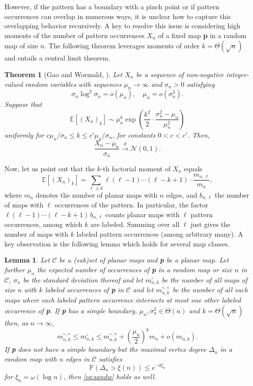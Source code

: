 \documentclass[reqno, 11pt]{amsart}
\newtheorem{theorem}{Theorem}
\newtheorem{lemma}{Lemma}
\theoremstyle{definition}
\theoremstyle{remark}
\newcommand{\PP}{\mathbb{P}}
\newcommand{\map}[1]{\textbf{#1}}
\numberwithin{equation}{section}
\begin{document}
However, if the pattern has a boundary with a pinch point or if pattern occurrences can overlap in numerous ways, it is unclear how to capture this overlapping behavior recursively. A key to resolve this issue is considering high moments of the number of pattern occurrences $X_n$ of a fixed map \map{p} in a random map of size $n$. The following theorem leverages moments of order $k = \Theta(\sqrt{n})$ and entails a central limit theorem.

\begin{theorem}[Gao and Wormald, \cite{GaoWormald}]\label{thm:gao}
    Let $X_n$ be a sequence of non-negative integer-valued random variables with sequences $\mu_n \to \infty$ and $\sigma_n > 0$ satisfying
    \[
        \sigma_n \log^2 \sigma_n = o(\mu_n), \quad \mu_n = o(\sigma_n^3).
    \]
    Suppose that
    \[
        \mathbb{E}[(X_n)_k] \sim \mu_n^k \exp\left( \frac{k^2}{2} \cdot \frac{\sigma_n^2 - \mu_n}{\mu_n^2} \right)
    \]
    uniformly for $c\mu_n/\sigma_n \le k \le c'\mu_n/\sigma_n$, for constants $0 < c < c'$. Then,
    \[
        \frac{X_n - \mu_n}{\sigma_n} \xrightarrow{d} \mathcal{N}(0, 1).
    \]
\end{theorem}

Now, let us point out that the $k$-th factorial moment of $X_n$ equals
\[
    \mathbb{E}[(X_n)_k] = \sum_{\ell \ge k} \ell (\ell-1)\cdots (\ell-k+1) \cdot \frac{m_{n,\ell}}{m_n},
\]
where $m_n$ denotes the number of planar maps with $n$ edges, and $b_{n,\ell}$ the number of maps with $\ell$ occurrences of the pattern. In particular, the factor $\ell (\ell-1)\cdots (\ell-k+1)\,b_{n,\ell}$ counts planar maps with $\ell$ pattern occurrences, among which $k$ are labeled. Summing over all $\ell$ just gives the number of maps with $k$ labeled pattern occurrences (among arbitrary many). A key observation is the following lemma which holds for several map classes.

\begin{lemma}\label{lem:S1}
    Let $\mathcal{C}$ be a (sub)set of planar maps and \map{p} be a planar map. Let further $\mu_n$ the expected number of occurrences of \map{p} in a random map or size $n$ in $\mathcal{C}$, $\sigma_n$ be the standard deviation thereof and let $m^\circ_{n,k}$ be the number of all maps of size $n$ with $k$ labeled occurrences of \map{p} in $\mathcal{C}$ and let $m^{\circ,\times}_{n,k}$ be the number of all such maps where each labeled pattern occurrence intersects at most one other labeled occurrence of \map{p}. If \map{p} has a simple boundary, $\mu_n, \sigma_n^2 \in \Theta(n)$ and $k = \Theta(\sqrt{n})$ then, as $n\rightarrow \infty$, 
    \begin{equation}\label{eq:sandw}
        m_{n,k}^{\circ,\times} \leq m_{n,k}^\circ \leq  m_{n,k}^{\circ,\times} + \left(\frac{\mu_n}{2}\right)^k m_{n} + o\left(m_{n,k}\right). 
    \end{equation}
    If \map{p} does not have a simple boundary but the maximal vertex degree $\Delta_n$ in a random map with $n$ edges in $\mathcal{C}$ satisfies
    \[
        \PP\left(\Delta_n > \xi(n)\right) \leq e^{-\delta \xi_n}
    \]
    for $\xi_n = \omega(\log n)$, then \eqref{eq:sandw} holds as well.
\end{lemma}
\end{document}
